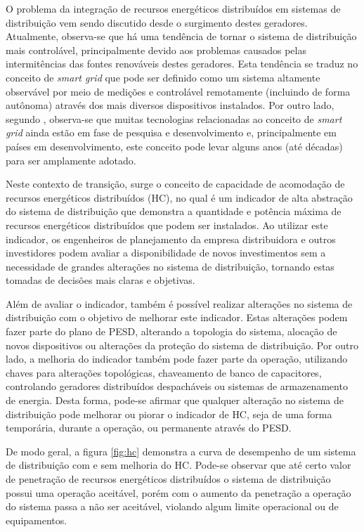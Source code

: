 O problema da integração de recursos energéticos distribuídos em sistemas de distribuição vem sendo discutido desde o surgimento destes geradores. Atualmente, observa-se que há uma tendência de tornar o sistema de distribuição mais controlável, principalmente devido aos problemas causados pelas intermitências das fontes renováveis destes geradores. Esta tendência se traduz no conceito de \textit{smart grid} que pode ser definido como um sistema altamente observável por meio de medições e controlável remotamente (incluindo de forma autônoma) através dos mais diversos dispositivos instalados. Por outro lado,  segundo , observa-se que muitas tecnologias relacionadas ao conceito de \textit{smart grid} ainda estão em fase de pesquisa e desenvolvimento e, principalmente em países em desenvolvimento, este conceito pode levar alguns anos (até décadas) para ser amplamente adotado. 

Neste contexto de transição, surge o conceito de capacidade de acomodação de recursos energéticos distribuídos (\ac{HC}), no qual é um indicador de alta abstração do sistema de distribuição que demonstra a quantidade e potência máxima de recursos energéticos distribuídos que podem ser instalados. Ao utilizar este indicador, os engenheiros de planejamento da empresa distribuidora e outros investidores podem avaliar a disponibilidade de novos investimentos sem a necessidade de grandes alterações no sistema de distribuição, tornando estas tomadas de decisões mais claras e objetivas.

Além de avaliar o indicador, também é possível realizar alterações no sistema de distribuição com o objetivo de melhorar este indicador. Estas alterações podem fazer parte do plano de \ac{PESD}, alterando a topologia do sistema, alocação de novos dispositivos ou alterações da proteção do sistema de distribuição. Por outro lado, a melhoria do indicador também pode fazer parte da operação, utilizando chaves para alterações topológicas, chaveamento de banco de capacitores, controlando geradores distribuídos despacháveis ou sistemas de armazenamento de energia. Desta forma, pode-se afirmar que qualquer alteração no sistema de distribuição pode melhorar ou piorar o indicador de \ac{HC}, seja de uma forma temporária, durante a operação, ou permanente através do \ac{PESD}.

De modo geral, a figura \ref{fig:hc} demonstra a curva de desempenho de um sistema de distribuição com e sem melhoria do \ac{HC}. Pode-se observar que até certo valor de penetração de recursos energéticos distribuídos o sistema de distribuição possui uma operação aceitável, porém com o aumento da penetração a operação do sistema passa a não ser aceitável, violando algum limite operacional ou de equipamentos. 


